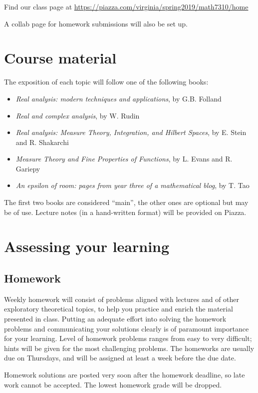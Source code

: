 \documentclass[oneside,11pt]{amsart}
\begin{document}
Find our class page at \url{https://piazza.com/virginia/spring2019/math7310/home}

A collab page for homework submissions will also be set up.

\section{Course material}

The exposition of each topic will follow one
of the following books:
\begin{itemize}
	\item \emph{Real analysis: modern techniques and applications}, by G.B. Folland
	\item \emph{Real and complex analysis}, by W. Rudin
	\item \emph{Real analysis: Measure Theory, Integration, and Hilbert Spaces},
		by E. Stein and R. Shakarchi
	\item \emph{Measure Theory and Fine Properties of Functions},
		by L. Evans and R. Gariepy
	\item \emph{An epsilon of room: pages from year three of a mathematical blog},
		by T. Tao
\end{itemize}
The first two books are considered ``main'', 
the other ones are optional but may be of use.
Lecture notes (in a hand-written format)
will be provided on Piazza. 

\section{Assessing your learning}

\subsection{Homework}

Weekly homework will consist of 
problems aligned with lectures
and of other exploratory theoretical topics,
to help you practice and enrich the material presented in class.
Putting an adequate effort into solving the homework
problems and 
communicating your solutions clearly is 
of paramount importance for your learning. 
Level of homework problems ranges from easy to very difficult;
hints will be given for the most challenging problems.
The homeworks are usually due on
Thursdays, and will be assigned at least a week before the due
date. 

Homework solutions are posted very soon after the 
homework deadline, so late work cannot be accepted.
The lowest homework grade will be dropped.
\end{document}
